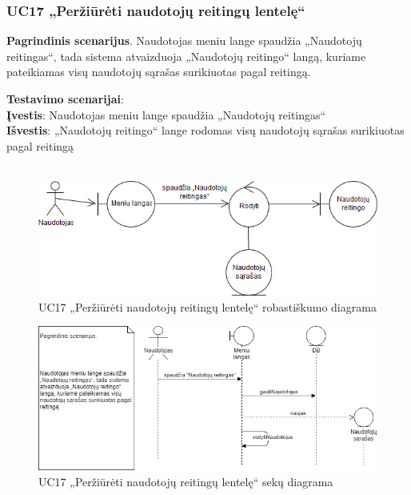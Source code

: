 \documentclass{VUMIFPSbakalaurinis}
\begin{document}
\subsubsection{UC17 „Peržiūrėti naudotojų reitingų lentelę“}
\textbf{Pagrindinis scenarijus}. Naudotojas meniu lange spaudžia „Naudotojų reitingas“, tada sistema atvaizduoja „Naudotojų reitingo“ langą, kuriame pateikiamas visų naudotojų sąrašas surikiuotas pagal reitingą.
\par \textbf{Testavimo scenarijai}:\\
\textbf{Įvestis}: Naudotojas meniu lange spaudžia „Naudotojų reitingas“\\
\textbf{Išvestis}: „Naudotojų reitingo“ lange rodomas visų naudotojų sąrašas surikiuotas pagal reitingą\\ \\

\begin{figure}[H]
	\centering
	\includegraphics[scale=0.6]{img/Robustness/UC17}
	\caption{UC17 „Peržiūrėti naudotojų reitingų lentelę“ robastiškumo diagrama}
	\label{img:uc17rob}
\end{figure}

\begin{figure}[H]
	\centering
	\includegraphics[scale=0.6]{img/Sequence/SD17}
	\caption{UC17 „Peržiūrėti naudotojų reitingų lentelę“ sekų diagrama}
	\label{img:uc17seq}
\end{figure}
\end{document}
